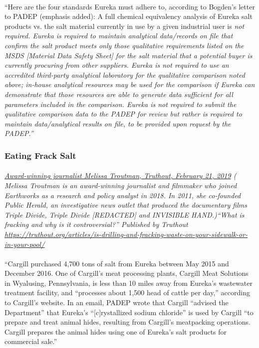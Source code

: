 \documentclass{article}
\begin{document}
\paragraph{}
``Here are the four standards Eureka must adhere to, according to Bogden’s letter to PADEP (emphasis added):
A full chemical equivalency analysis of Eureka salt products vs. the salt material currently in use by a given industrial user is \em not required\em. Eureka is required to maintain analytical data/records on file that confirm the salt product meets \em only \em those qualitative requirements listed on the MSDS [Material Data Safety Sheet] for the salt material that a potential buyer is currently procuring from other suppliers. Eureka is \em not required \em to use an accredited third-party analytical laboratory for the qualitative comparison noted above; in-house analytical resources may be used for the comparison if Eureka can demonstrate that those resources are able to generate data sufficient for all parameters included in the comparison. Eureka is \em not required \em to submit the qualitative comparison data to the PADEP for review but rather is required to maintain data/analytical results on file, to be provided upon request by the PADEP.”

\subsubsection{Eating Frack Salt}
\paragraph{}
\small
\textit{
\underline{Award-winning journalist Melissa Troutman, Truthout, February 21, 2019}
( Melissa Troutman is an award-winning journalist and filmmaker who joined Earthworks as a research and policy analyst in 2018. In 2011, she co-founded Public Herald, an investigative news outlet that produced the documentary films Triple Divide, Triple Divide [REDACTED] and INVISIBLE HAND.)``What is fracking and why is it controversial?'' Published by Truthout
\url{https://truthout.org/articles/is-drilling-and-fracking-waste-on-your-sidewalk-or-in-your-pool/}}
\normalsize
\paragraph{}
``Cargill purchased 4,700 tons of salt from Eureka between May 2015 and December 2016. One of Cargill’s meat processing plants, Cargill Meat Solutions in Wyalusing, Pennsylvania, is less than 10 miles away from Eureka’s wastewater treatment facility, and “processes about 1,500 head of cattle per day,” according to Cargill’s website. In an email, PADEP wrote that Cargill “advised the Department” that Eureka’s “[c]rystallized sodium chloride” is used by Cargill “to prepare and treat animal hides, resulting from Cargill’s meatpacking operations. Cargill prepares the animal hides using one of Eureka’s salt products for commercial sale.”
\end{document}
